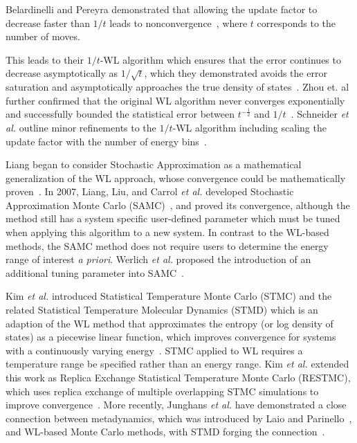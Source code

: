 \documentclass[letterpaper,twocolumn,amsmath,amssymb,pre,aps,10pt]{revtex4-1}
\begin{document}
Belardinelli and Pereyra demonstrated that allowing the update factor to
decrease faster than $1/t$ leads to nonconvergence~\cite{belardinelli2007wang},
where $t$ corresponds to the number of moves.


This leads to their $1/t$-WL algorithm which ensures that the error continues to
decrease asymptotically as $1/\sqrt{t}$, which they demonstrated avoids the
error saturation and asymptotically approaches the true density of
states~\cite{belardinelli2008analysis}. Zhou et. al further confirmed that the
original WL algorithm never converges exponentially and successfully bounded the
statistical error between $t^{-\frac12}$ and $1/t$~\cite{zhou2008optimal}.
Schneider \emph{et al.} outline minor refinements to the $1/t$-WL algorithm
including scaling the update factor with the number of energy
bins~\cite{schneider2017convergence}.


Liang began to consider Stochastic Approximation as a mathematical
generalization of the WL approach, whose convergence could be mathematically
proven~\cite{liang2006theory}. In 2007, Liang, Liu, and Carrol \emph{et al.}
developed Stochastic Approximation Monte Carlo (SAMC)~\cite{liang2007stochastic,
liang2009improving}, and proved its convergence, although the method still has a
system specific user-defined parameter which must be tuned when applying this
algorithm to a new system.  In contrast to the WL-based methods, the SAMC method
does not require users to determine the energy range of interest \emph{a
priori}. Werlich \emph{et al.} proposed the introduction of an additional tuning
parameter into SAMC~\cite{werlich2015stochastic}.

Kim \emph{et al.} introduced Statistical Temperature Monte Carlo (STMC) and the
related Statistical Temperature Molecular Dynamics (STMD) which is an
adaption of the WL method that approximates the entropy (or log density of
states) as a piecewise linear function, which improves convergence for systems
with a continuously varying energy~\cite{kim2006statistical,
kim2007statistical}. STMC applied to WL requires a temperature range be
specified rather than an energy range.  Kim \emph{et al.} extended this work as
Replica Exchange Statistical Temperature Monte Carlo (RESTMC), which uses
replica exchange of multiple overlapping STMC simulations to improve
convergence~\cite{kim2009replica}. More recently, Junghans \emph{et al.} have
demonstrated a close connection between metadynamics, which was introduced by
Laio and Parinello~\cite{laio2002escaping}, and WL-based Monte Carlo methods,
with STMD forging the connection~\cite{junghans2014molecular}.
\end{document}
